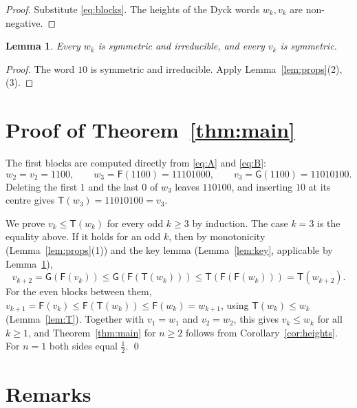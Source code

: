 \documentclass[11pt]{amsart}
\newtheorem{lemma}[proposition]{Lemma}
\theoremstyle{definition}
\theoremstyle{remark}
\numberwithin{equation}{section}
\newcommand{\cF}{\mathsf F}
\newcommand{\cG}{\mathsf G}
\newcommand{\cT}{\mathsf T}
\begin{document}
\begin{proof}
Substitute \eqref{eq:blocks}. The heights of the Dyck words $w_k,v_k$ are non-negative.
\end{proof}

\begin{lemma}\label{lem:wsym}
Every $w_k$ is symmetric and irreducible, and every $v_k$ is symmetric.
\end{lemma}

\begin{proof}
The word $10$ is symmetric and irreducible. Apply Lemma~\ref{lem:props}(2),(3).
\end{proof}

\section{Proof of Theorem~\ref{thm:main}}\label{sec:proof}

The first blocks are computed directly from \eqref{eq:A} and \eqref{eq:B}:
\[
w_2=v_2=1100,\qquad w_3=\cF(1100)=11101000,\qquad v_3=\cG(1100)=11010100.
\]
Deleting the first $1$ and the last $0$ of $w_3$ leaves $110100$, and inserting $10$ at its centre gives $\cT(w_3)=11010100=v_3$.

We prove $v_k\le\cT(w_k)$ for every odd $k\ge3$ by induction. The case $k=3$ is the equality above. If it holds for an odd $k$, then by monotonicity (Lemma~\ref{lem:props}(1)) and the key lemma (Lemma~\ref{lem:key}, applicable by Lemma~\ref{lem:wsym}),
\[
v_{k+2}=\cG(\cF(v_k))\le\cG(\cF(\cT(w_k)))\le\cT(\cF(\cF(w_k)))=\cT(w_{k+2}).
\]
For the even blocks between them, $v_{k+1}=\cF(v_k)\le\cF(\cT(w_k))\le\cF(w_k)=w_{k+1}$, using $\cT(w_k)\le w_k$ (Lemma~\ref{lem:T}). Together with $v_1=w_1$ and $v_2=w_2$, this gives $v_k\le w_k$ for all $k\ge1$, and Theorem~\ref{thm:main} for $n\ge2$ follows from Corollary~\ref{cor:heights}. For $n=1$ both sides equal $\frac12$. \qed


\section{Remarks}\label{sec:remarks}
\end{document}
